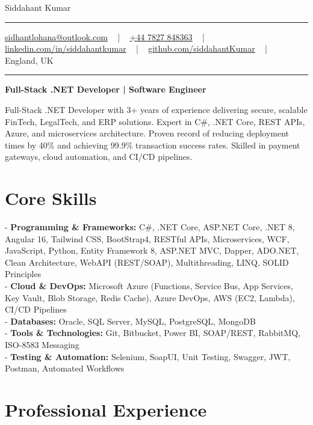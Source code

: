 \documentclass[letterpaper,10pt]{article}
\newcommand{\documentTitle}[2]{
  \begin{center}
    \vspace*{-0.3in}
    {\Huge\color{accentTitle} #1}
    \vspace{8pt}
    {\color{accentLine} \hrule}
    \vspace{2pt}
    \footnotesize{#2}
    \vspace{2pt}
    {\color{accentLine} \hrule}
  \end{center}
}
\begin{document}
\documentTitle{Siddahant Kumar}{
\vspace{0.1cm}
\href{mailto:sidhantlohana@outlook.com}{sidhantlohana@outlook.com} ~ | ~
\href{tel:+447827848363}{+44 7827 848363} ~ | ~
\href{https://www.linkedin.com/in/siddahantkumar/}{linkedin.com/in/siddahantkumar} ~ | ~
\href{https://github.com/siddahantKumar}{github.com/siddahantKumar} ~ | ~
England, UK
}

\begin{center}
\textbf{Full-Stack .NET Developer | Software Engineer}
\end{center}

Full-Stack .NET Developer with 3+ years of experience delivering secure, scalable FinTech, LegalTech, and ERP solutions. Expert in C\#, .NET Core, REST APIs, Azure, and microservices architecture. Proven record of reducing deployment times by 40\% and achieving 99.9\% transaction success rates. Skilled in payment gateways, cloud automation, and CI/CD pipelines.


\section{Core Skills}

\noindent
- \textbf{Programming \& Frameworks:} C\#, .NET Core, ASP.NET Core, .NET 8, Angular 16, Tailwind CSS, BootStrap4, RESTful APIs, Microservices, WCF, JavaScript, Python, Entity Framework 8, ASP.NET MVC, Dapper, ADO.NET, Clean Architecture, WebAPI (REST/SOAP), Multithreading, LINQ, SOLID Principles \\
- \textbf{Cloud \& DevOps:} Microsoft Azure (Functions, Service Bus, App Services, Key Vault, Blob Storage, Redis Cache), Azure DevOps, AWS (EC2, Lambda), CI/CD Pipelines \\
- \textbf{Databases:} Oracle, SQL Server, MySQL, PostgreSQL, MongoDB \\
- \textbf{Tools \& Technologies:} Git, Bitbucket, Power BI, SOAP/REST, RabbitMQ, ISO-8583 Messaging \\
- \textbf{Testing \& Automation:} Selenium, SoapUI, Unit Testing, Swagger, JWT, Postman, Automated Workflows

\section{Professional Experience}
\end{document}
